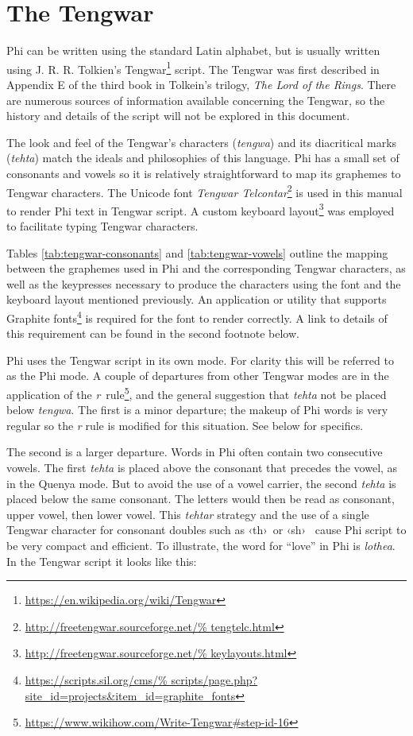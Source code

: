 \section{The Tengwar}
Phi can be written using the standard Latin alphabet, but is usually written
using J. R. R. Tolkien's
Tengwar\footnote{\url{https://en.wikipedia.org/wiki/Tengwar}} script. The Tengwar
was first described in Appendix E of the third book in Tolkein's trilogy,
\emph{The Lord of the Rings}. There are numerous sources of information
available concerning the Tengwar, so the history and details of the script will
not be explored in this document.

The look and feel of the Tengwar's characters (\emph{tengwa}) and its
diacritical marks (\emph{tehta}) match the ideals and philosophies of this
language. Phi has a small set of consonants and vowels so it is relatively
straightforward to map its graphemes to Tengwar characters. The Unicode font
\emph{Tengwar Telcontar}\footnote{\url{http://freetengwar.sourceforge.net/%
tengtelc.html}} is used in this manual to render Phi text in Tengwar script. A
custom keyboard layout\footnote{\url{http://freetengwar.sourceforge.net/%
keylayouts.html}} was employed to facilitate typing Tengwar characters.

Tables \ref{tab:tengwar-consonants} and \ref{tab:tengwar-vowels} outline the
mapping between the graphemes used in Phi and the corresponding Tengwar
characters, as well as the keypresses necessary to produce the characters using
the font and the keyboard layout mentioned previously. An application or utility
that supports Graphite fonts\footnote{\url{https://scripts.sil.org/cms/%
scripts/page.php?site\_id=projects\&item\_id=graphite\_fonts}} is required for
the font to render correctly. A link to details of this requirement can be found
in the second footnote below.

Phi uses the Tengwar script in its own mode. For clarity this will be referred
to as the Phi mode. A couple of departures from other Tengwar modes are in the
application of the
\emph{r}~rule\footnote{\url{https://www.wikihow.com/Write-Tengwar\#step-id-16}},
and the general suggestion that \emph{tehta} not be placed below \emph{tengwa}.
The first is a minor departure; the makeup of Phi words is very regular so the
\emph{r} rule is modified for this situation. See below for specifics.

The second is a larger departure. Words in Phi often contain two consecutive
vowels. The first \emph{tehta} is placed above the consonant that precedes the
vowel, as in the Quenya mode. But to avoid the use of a vowel carrier, the
second \emph{tehta} is placed below the same consonant. The letters would then
be read as consonant, upper vowel, then lower vowel.
\clearpage
This \emph{tehtar} strategy and the use of a single Tengwar character for
consonant doubles such as \dscopy ‹th›~\normalfont or \dscopy ‹sh›~\normalfont
cause Phi script to be very compact and efficient. To illustrate, the word for
\enquote{love} in Phi is \emph{lothea}. In the Tengwar script it looks like
this:

